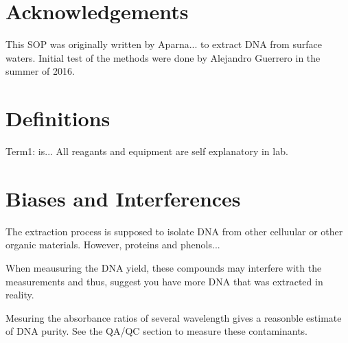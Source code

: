\documentclass[12pt]{../SOP3_alpha}
\begin{document}
\tableofcontents

\newpage

\section{Acknowledgements}

\NP This SOP was originally written by Aparna... to extract DNA from surface waters. Initial test of the methods were done by Alejandro Guerrero in the summer of 2016. 

\section{Definitions}

\NP Term1: is... All reagants and equipment are self explanatory in lab. 

\section{Biases and Interferences}

\NP The extraction process is supposed to isolate DNA from other celluular or other organic materials. However, proteins and phenols...  

\NP When meausuring the DNA yield, these compounds may interfere with the measurements and thus, suggest you have more DNA that was extracted in reality. 

\NP Mesuring the absorbance ratios of several wavelength gives a reasonble estimate of DNA purity. See the QA/QC section to measure these contaminants.
\end{document}
